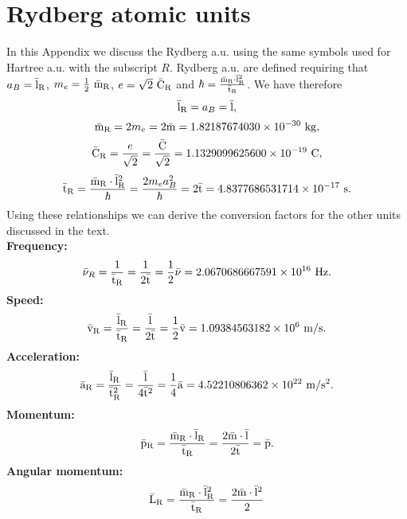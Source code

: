 \documentclass[12pt,a4paper,twoside]{report}
\def\barmry{1.82187674030\times 10^{-30}}
\def\bartry{4.8377686531714\times 10^{-17}}
\def\barnury{2.0670686667591\times 10^{16}}
\def\barvry{1.09384563182\times 10^{6}}
\def\barary{4.52210806362\times 10^{22}}
\def\barcry{1.1329099625600\times 10^{-19}}
\begin{document}
{{\color{dark-blue}\chapter{Rydberg atomic units}}
{\color{violet}
In this Appendix we discuss the Rydberg a.u. using the same 
symbols used for Hartree a.u. with the subscript $R$.
Rydberg a.u. are defined requiring that
$a_B={\rm \bar l_R}$, $m_e={1\over 2}\ {\rm \bar m_R}$, $e=\sqrt{2}\ {\rm \bar C_R}$ and 
$\hbar= {{\rm \bar m_R} \cdot {\rm \bar l_R}^2 \over {\rm \bar t_R}}$.
We have therefore 
\begin{equation}
{\rm \bar l_R}=a_B={\rm \bar l},
\end{equation}
\begin{equation}
{\rm \bar m_R}=2 m_e=2 {\rm \bar m}=\barmry\ {\rm kg},
\end{equation}
\begin{equation}
{\rm \bar C_R}={e \over \sqrt{2}}= {{\rm \bar C} \over \sqrt{2}}=\barcry\ {\rm C},
\end{equation}
\begin{equation}
{\rm \bar t_R}={{\rm \bar m_R}\cdot {\rm \bar l_R}^2 \over \hbar}= {2 m_e a_B^2 \over \hbar}=
2 {\rm \bar t}=\bartry\ {\rm s}.
\end{equation}
Using these relationships we can derive the conversion factors for
the other units discussed in the text. \\
{\bf Frequency:}
\begin{equation}
\bar \nu_R={1\over {\rm \bar t_R}}= {1\over 2 {\rm \bar t}}= {1\over 2}\bar \nu=
\barnury\ {\rm Hz}.
\end{equation}
{\bf Speed:}
\begin{equation}
{\rm \bar v_R}={{\rm \bar l_R}\over {\rm \bar t_R}}= {{\rm \bar l}\over 2 {\rm \bar t}}= {1\over 2}{\rm \bar v}=
\barvry\ {\rm m}/{\rm s}.
\end{equation}
{\bf Acceleration:}
\begin{equation}
{\rm \bar a_R}={{\rm \bar l_R}\over {\rm \bar t_R}^2}= {{\rm \bar l}\over 4 {\rm \bar t}^2}=
{1\over 4}{\rm \bar a}=\barary\ {\rm m}/{\rm s}^2.
\end{equation}
{\bf Momentum:}
\begin{equation}
{\rm \bar p_R}={{\rm \bar m_R}\cdot {\rm \bar l_R}\over {\rm \bar t_R}}= {2 {\rm \bar m}\cdot {\rm \bar l}\over 2 {\rm \bar t}}= 
{\rm \bar p}.
\end{equation}
{\bf Angular momentum:}
\begin{equation}
{\rm \bar L_R}={{\rm \bar m_R}\cdot {\rm \bar l_R}^2\over {\rm \bar t_R}}= {2 {\rm \bar m}\cdot {\rm \bar l}^2\over 2 
}
\end{equation}}}
\end{document}

